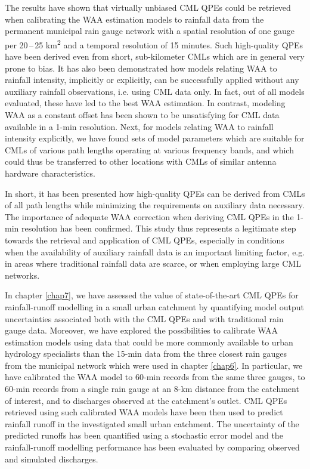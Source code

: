 \documentclass{ctuthesis}\usepackage[]{graphicx}\usepackage[]{color}
\begin{document}
The results have shown that virtually unbiased CML QPEs could be retrieved when calibrating the WAA estimation models to rainfall data from the permanent municipal rain gauge network with a spatial resolution of one gauge per 20\,--\,25 km\textsuperscript{2} and a temporal resolution of 15 minutes. Such high-quality QPEs have been derived even from short, sub-kilometer CMLs which are in general very prone to bias. It has also been demonstrated how models relating WAA to rainfall intensity, implicitly or explicitly, can be successfully applied without any auxiliary rainfall observations, i.e. using CML data only. In fact, out of all models evaluated, these have led to the best WAA estimation. In contrast, modeling WAA as a constant offset has been shown to be unsatisfying for CML data available in a 1-min resolution. Next, for models relating WAA to rainfall intensity explicitly, we have found sets of model parameters which are suitable for CMLs of various path lengths operating at various frequency bands, and which could thus be transferred to other locations with CMLs of similar antenna hardware characteristics.  

In short, it has been presented how high-quality QPEs can be derived from CMLs of all path lengths while minimizing the requirements on auxiliary data necessary. The importance of adequate WAA correction when deriving CML QPEs in the 1-min resolution has been confirmed. This study thus represents a legitimate step towards the retrieval and application of CML QPEs, especially in conditions when the availability of auxiliary rainfall data is an important limiting factor, e.g. in areas where traditional rainfall data are scarce, or when employing large CML networks.


In chapter \ref{chap7}, we have assessed the value of state-of-the-art CML QPEs for rainfall-runoff modelling in a small urban catchment by quantifying model output uncertainties associated both with the CML QPEs and with traditional rain gauge data. Moreover, we have explored the possibilities to calibrate WAA estimation models using data that could be more commonly available to urban hydrology specialists than the 15-min data from the three closest rain gauges from the municipal network which were used in chapter \ref{chap6}. In particular, we have calibrated the WAA model to 60-min records from the same three gauges, to 60-min records from a single rain gauge at an 8-km distance from the catchment of interest, and to discharges observed at the catchment's outlet. CML QPEs retrieved using such calibrated WAA models have been then used to predict rainfall runoff in the investigated small urban catchment. The uncertainty of the predicted runoffs has been quantified using a stochastic error model and the rainfall-runoff modelling performance has been evaluated by comparing observed and simulated discharges.
\end{document}
